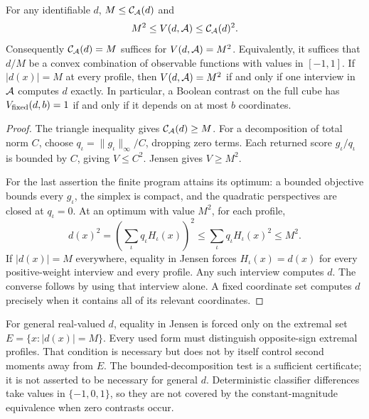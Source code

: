 \begin{proposition}\label{prop:equality}
For any identifiable $d$, $M\le \mathcal C_\mathcal A(d)$ and
\[
 M^2\le V(d,\mathcal A)\le \mathcal C_\mathcal A(d)^2.
\]
Consequently $\mathcal C_\mathcal A(d)=M$ suffices for $V(d,\mathcal A)=M^2$. Equivalently, it suffices that $d/M$ be a convex combination of observable functions with values in $[-1,1]$.
If $|d(x)|=M$ at every profile, then $V(d,\mathcal A)=M^2$ if and only if one interview in $\mathcal A$ computes $d$ exactly. In particular, a Boolean contrast on the full cube has $V_{\rm fixed}(d,b)=1$ if and only if it depends on at most $b$ coordinates.
\end{proposition}
\begin{proof}
The triangle inequality gives $\mathcal C_\mathcal A(d)\ge M$. For a decomposition of total norm $C$, choose $q_\iota=\|g_\iota\|_\infty/C$, dropping zero terms. Each returned score $g_\iota/q_\iota$ is bounded by $C$, giving $V\le C^2$. Jensen gives $V\ge M^2$.

For the last assertion the finite program attains its optimum: a bounded objective bounds every $g_\iota$, the simplex is compact, and the quadratic perspectives are closed at $q_\iota=0$. At an optimum with value $M^2$, for each profile,
\[
 d(x)^2=\left(\sum_\iota q_\iota H_\iota(x)\right)^2
 \le\sum_\iota q_\iota H_\iota(x)^2\le M^2.
\]
If $|d(x)|=M$ everywhere, equality in Jensen forces $H_\iota(x)=d(x)$ for every positive-weight interview and every profile. Any such interview computes $d$. The converse follows by using that interview alone. A fixed coordinate set computes $d$ precisely when it contains all of its relevant coordinates.
\end{proof}

For general real-valued $d$, equality in Jensen is forced only on the extremal set $E=\{x:|d(x)|=M\}$. Every used form must distinguish opposite-sign extremal profiles. That condition is necessary but does not by itself control second moments away from $E$. The bounded-decomposition test is a sufficient certificate; it is not asserted to be necessary for general $d$. Deterministic classifier differences take values in $\{-1,0,1\}$, so they are not covered by the constant-magnitude equivalence when zero contrasts occur.

